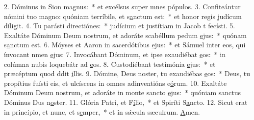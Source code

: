 2. Dóminus in Sion m\uline{a}gnus:~* et excélsus super mnes p\uline{ó}pulos.
3. Confiteántur nómini tuo magno: quóniam terríbile, et s\uline{a}nctum est:~* et honor regis judícum d\uline{í}ligit.
4. Tu parásti directi\uline{ó}nes:~* judícium et justítiam in Jacob t fec\uline{í}sti.
5. Exaltáte Dóminum Deum nostrum, et adoráte scabéllum pedum \uline{e}jus:~* quónam s\uline{a}nctum est.
6. Móyses et Aaron in sacerdótibus \uline{e}jus:~* et Sámuel inter eos, qui ínvocant nmen \uline{e}jus:
7. Invocábant Dóminum, et ipse exaudiébat \uline{e}os:~* in colúmna nubis loquebátr ad \uline{e}os.
8. Custodiébant testimónia \uline{e}jus:~* et præcéptum quod ddit \uline{i}llis.
9. Dómine, Deus noster, tu exaudiébas \uline{e}os:~* Deus, tu propítius fuísti eis, et ulcíscens in omnes adinventións e\uline{ó}rum.
10. Exaltáte Dóminum Deum nostrum, et adoráte in monte sancto \uline{e}jus:~* quóniam sanctus Dóminus Dus n\uline{o}ster.
11. Glória Patri, et F\uline{í}lio,~* et Spiríti S\uline{a}ncto.
12. Sicut erat in princípio, et nunc, et s\uline{e}mper,~* et in sǽcula sæculrum. \uline{A}men.
